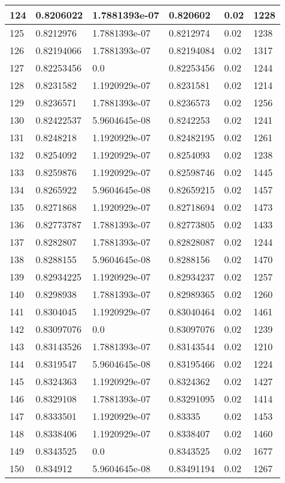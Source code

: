 \begin{longtable}{|l|l|l|l|l|l|}
124 & 0.8206022 & 1.7881393e-07 & 0.820602 & 0.02 & 1228 \\ \hline 
125 & 0.8212976 & 1.7881393e-07 & 0.8212974 & 0.02 & 1238 \\ \hline 
126 & 0.82194066 & 1.7881393e-07 & 0.82194084 & 0.02 & 1317 \\ \hline 
127 & 0.82253456 & 0.0 & 0.82253456 & 0.02 & 1244 \\ \hline 
128 & 0.8231582 & 1.1920929e-07 & 0.8231581 & 0.02 & 1214 \\ \hline 
129 & 0.8236571 & 1.7881393e-07 & 0.8236573 & 0.02 & 1256 \\ \hline 
130 & 0.82422537 & 5.9604645e-08 & 0.8242253 & 0.02 & 1241 \\ \hline 
131 & 0.8248218 & 1.1920929e-07 & 0.82482195 & 0.02 & 1261 \\ \hline 
132 & 0.8254092 & 1.1920929e-07 & 0.8254093 & 0.02 & 1238 \\ \hline 
133 & 0.8259876 & 1.1920929e-07 & 0.82598746 & 0.02 & 1445 \\ \hline 
134 & 0.8265922 & 5.9604645e-08 & 0.82659215 & 0.02 & 1457 \\ \hline 
135 & 0.8271868 & 1.1920929e-07 & 0.82718694 & 0.02 & 1473 \\ \hline 
136 & 0.82773787 & 1.7881393e-07 & 0.82773805 & 0.02 & 1433 \\ \hline 
137 & 0.8282807 & 1.7881393e-07 & 0.82828087 & 0.02 & 1244 \\ \hline 
138 & 0.8288155 & 5.9604645e-08 & 0.8288156 & 0.02 & 1470 \\ \hline 
139 & 0.82934225 & 1.1920929e-07 & 0.82934237 & 0.02 & 1257 \\ \hline 
140 & 0.8298938 & 1.7881393e-07 & 0.82989365 & 0.02 & 1260 \\ \hline 
141 & 0.8304045 & 1.1920929e-07 & 0.83040464 & 0.02 & 1461 \\ \hline 
142 & 0.83097076 & 0.0 & 0.83097076 & 0.02 & 1239 \\ \hline 
143 & 0.83143526 & 1.7881393e-07 & 0.83143544 & 0.02 & 1210 \\ \hline 
144 & 0.8319547 & 5.9604645e-08 & 0.83195466 & 0.02 & 1224 \\ \hline 
145 & 0.8324363 & 1.1920929e-07 & 0.8324362 & 0.02 & 1427 \\ \hline 
146 & 0.8329108 & 1.7881393e-07 & 0.83291095 & 0.02 & 1414 \\ \hline 
147 & 0.8333501 & 1.1920929e-07 & 0.83335 & 0.02 & 1453 \\ \hline 
148 & 0.8338406 & 1.1920929e-07 & 0.8338407 & 0.02 & 1460 \\ \hline 
149 & 0.8343525 & 0.0 & 0.8343525 & 0.02 & 1677 \\ \hline 
150 & 0.834912 & 5.9604645e-08 & 0.83491194 & 0.02 & 1267 \\ \hline 
\end{longtable}